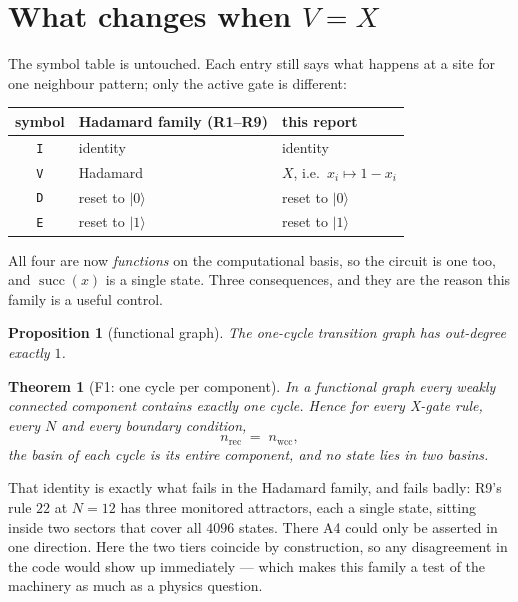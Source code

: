 \documentclass[11pt]{article}
\newcommand{\rt}[1]{\texttt{#1}}
\providecommand{\ket}[1]{|#1\rangle}
\newcommand{\wcc}{\mathrm{wcc}}
\newcommand{\rec}{\mathrm{rec}}
\theoremstyle{plain}
\newtheorem{theorem}{Theorem}
\newtheorem{proposition}{Proposition}
\theoremstyle{definition}
\begin{document}
\tableofcontents

\section{What changes when $V=X$}
\label{sec:setup}

The symbol table is untouched. Each entry still says what happens at a site for
one neighbour pattern; only the active gate is different:

\begin{center}
\begin{tabular}{cll}
\toprule
symbol & Hadamard family (R1--R9) & this report \\
\midrule
\rt{I} & identity & identity \\
\rt{V} & Hadamard & $X$, i.e.\ $x_i\mapsto1-x_i$ \\
\rt{D} & reset to $\ket0$ & reset to $\ket0$ \\
\rt{E} & reset to $\ket1$ & reset to $\ket1$ \\
\bottomrule
\end{tabular}
\end{center}

\noindent All four are now \emph{functions} on the computational basis, so the
circuit is one too, and $\operatorname{succ}(x)$ is a single state. Three
consequences, and they are the reason this family is a useful control.

\begin{proposition}[functional graph]
The one-cycle transition graph has out-degree exactly $1$.
\end{proposition}

\begin{theorem}[F1: one cycle per component]
In a functional graph every weakly connected component contains exactly one
cycle. Hence for every X-gate rule, every $N$ and every boundary condition,
\begin{equation}
n_\rec \;=\; n_\wcc ,
\label{eq:F1}
\end{equation}
the basin of each cycle is its entire component, and no state lies in two basins.
\end{theorem}

\noindent That identity is exactly what fails in the Hadamard family, and fails
badly: R9's rule $22$ at $N=12$ has three monitored attractors, each a single
state, sitting inside two sectors that cover all $4096$ states. There A4 could
only be asserted in one direction. Here the two tiers coincide by construction,
so any disagreement in the code would show up immediately --- which makes this
family a test of the machinery as much as a physics question.
\end{document}
